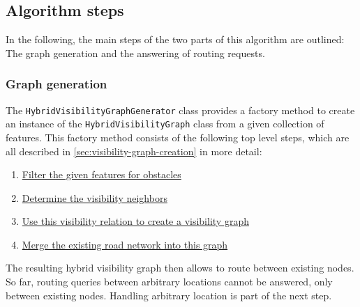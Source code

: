%
			
	\subsection{Algorithm steps}
	\label{subsec:algorithm-steps}
	
		In the following, the main steps of the two parts of this algorithm are outlined:
		The graph generation and the answering of routing requests.
		
		\subsubsection{Graph generation}
		\label{subsubsec:graph-generation}
		
			The \texttt{HybridVisibilityGraphGenerator} class provides a factory method to create an instance of the \texttt{HybridVisibilityGraph} class from a given collection of features.
			This factory method consists of the following top level steps, which are all described in \cref{sec:visibility-graph-creation} in more detail:
			\begin{enumerate}
				\item \hyperref[subsec:step-1-preprocessing]{Filter the given features for obstacles}
				\item \hyperref[subsec:step-2-knn-search]{Determine the visibility neighbors}
				\item \hyperref[subsec:step-3-graph-creation]{Use this visibility relation to create a visibility graph}
				\item \hyperref[subsec:step-4-graph merging]{Merge the existing road network into this graph}
			\end{enumerate}
			The resulting hybrid visibility graph then allows to route between existing nodes.
			So far, routing queries between arbitrary locations cannot be answered, only between existing nodes.
			Handling arbitrary location is part of the next step.
		
